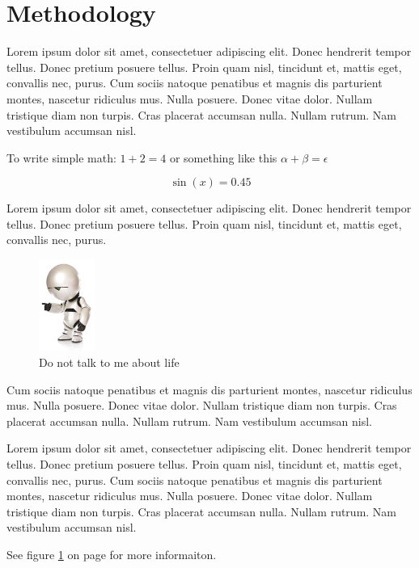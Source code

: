 \documentclass{article}
\begin{document}
\section{Methodology}
Lorem ipsum dolor sit amet, consectetuer adipiscing elit.  Donec hendrerit tempor tellus.  Donec pretium posuere tellus.  Proin quam nisl, tincidunt et, mattis eget, convallis nec, purus.  Cum sociis natoque penatibus et magnis dis parturient montes, nascetur ridiculus mus.  Nulla posuere.  Donec vitae dolor.  Nullam tristique diam non turpis.  Cras placerat accumsan nulla.  Nullam rutrum.  Nam vestibulum accumsan nisl.

To write simple math: $1 + 2 = 4$ or something like this $\alpha + \beta = \epsilon$

\begin{equation}
\sin(x) = 0.45 
\end{equation}

Lorem ipsum dolor sit amet, consectetuer adipiscing elit.  Donec hendrerit
tempor tellus.  Donec pretium posuere tellus.  Proin quam nisl, tincidunt et,
mattis eget, convallis nec, purus.  

\begin{figure}[h]
  \centering
  \includegraphics[height=3cm]{marvin}
  \caption{Do not talk to me about life}
\label{fig:marvin}
\end{figure}

Cum sociis natoque penatibus et magnis dis parturient montes, nascetur ridiculus mus.  Nulla posuere.  Donec vitae dolor.  Nullam tristique diam non turpis.  Cras placerat accumsan nulla.  Nullam rutrum.  Nam vestibulum accumsan nisl.

Lorem ipsum dolor sit amet, consectetuer adipiscing elit.  Donec hendrerit tempor tellus.  Donec pretium posuere tellus.  Proin quam nisl, tincidunt et, mattis eget, convallis nec, purus.  Cum sociis natoque penatibus et magnis dis parturient montes, nascetur ridiculus mus.  Nulla posuere.  Donec vitae dolor.  Nullam tristique diam non turpis.  Cras placerat accumsan nulla.  Nullam rutrum.  Nam vestibulum accumsan nisl.

See figure \ref{fig:marvin} on page \pageref{fig:marvin} for more informaiton.
\end{document}
